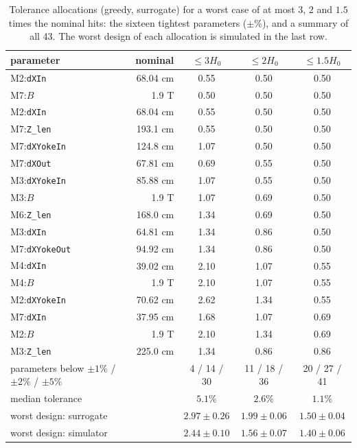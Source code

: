 \documentclass[11pt,a4paper]{article}
\begin{document}
\begin{table}[!htb]
\centering
\caption{Tolerance allocations (greedy, surrogate) for a worst case of at most $3$, $2$ and $1.5$
times the nominal hits: the sixteen tightest parameters ($\pm\%$), and a summary of all 43. The
worst design of each allocation is simulated in the last row.}
\label{tab:allocation}
\small
\begin{tabular}{lrccc}
\toprule
parameter & nominal & $\le3H_0$ & $\le2H_0$ & $\le1.5H_0$ \\
\midrule
M2:\texttt{dXIn}         & 68.04 cm & 0.55 & 0.50 & 0.50 \\
M7:$B$                   & 1.9 T    & 0.50 & 0.50 & 0.50 \\
M2:\texttt{dXIn}         & 68.04 cm & 0.55 & 0.50 & 0.50 \\
M7:\texttt{Z\_len}       & 193.1 cm & 0.55 & 0.50 & 0.50 \\
M7:\texttt{dXYokeIn}     & 124.8 cm & 1.07 & 0.50 & 0.50 \\
M7:\texttt{dXOut}        & 67.81 cm & 0.69 & 0.55 & 0.50 \\
M3:\texttt{dXYokeIn}     & 85.88 cm & 1.07 & 0.55 & 0.50 \\
M3:$B$                   & 1.9 T    & 1.07 & 0.69 & 0.50 \\
M6:\texttt{Z\_len}       & 168.0 cm & 1.34 & 0.69 & 0.50 \\
M3:\texttt{dXIn}         & 64.81 cm & 1.34 & 0.86 & 0.50 \\
M7:\texttt{dXYokeOut}    & 94.92 cm & 1.34 & 0.86 & 0.50 \\
M4:\texttt{dXIn}         & 39.02 cm & 2.10 & 1.07 & 0.55 \\
M4:$B$                   & 1.9 T    & 2.10 & 1.07 & 0.55 \\
M2:\texttt{dXYokeIn}     & 70.62 cm & 2.62 & 1.34 & 0.55 \\
M7:\texttt{dXIn}         & 37.95 cm & 1.68 & 1.07 & 0.69 \\
M2:$B$                   & 1.9 T    & 2.10 & 1.34 & 0.69 \\
M3:\texttt{Z\_len}       & 225.0 cm & 1.34 & 0.86 & 0.86 \\
\midrule
parameters below $\pm1\%$ / $\pm2\%$ / $\pm5\%$ & & 4 / 14 / 30 & 11 / 18 / 36 & 20 / 27 / 41 \\
median tolerance & & $5.1\%$ & $2.6\%$ & $1.1\%$ \\
\midrule
worst design: surrogate & & $2.97\pm0.26$ & $1.99\pm0.06$ & $1.50\pm0.04$ \\
worst design: simulator & & $2.44\pm0.10$ & $1.56\pm0.07$ & $1.40\pm0.06$ \\
\bottomrule
\end{tabular}
\end{table}
\end{document}
